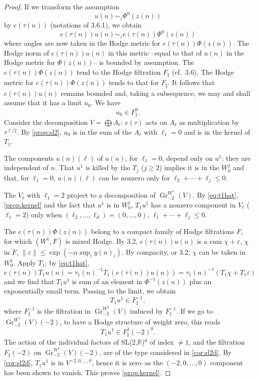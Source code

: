 \documentclass[11pt,a4paper]{article}
\theoremstyle{plain}
\theoremstyle{definition}
\DeclareMathOperator{\Gr}{Gr}
\begin{document}
\begin{proof}
If we transform the assumption
\[
u(n)\sim_z\Phi^0(z(n))
\]
by $e(\tau(n))$ (notations of 3.6.1), we obtain
\[
e(\tau(n))u(n)\sim_z e(\tau(n))\Phi^0(z(n))
\]
where angles are now taken in the Hodge metric for $e(\tau(n))\Phi(z(n))$. The Hodge norm of $e(\tau(n))u(n)$ in this metric --equal to that of $u(n)$ in the Hodge metric for $\Phi(z(n))$-- is bounded by assumption. The $e(\tau(n))\Phi(z(n))$ tend to the Hodge filtration $F_{\sharp}$ (cf.\ 3.6). The Hodge metric for $e(\tau(n))\Phi(z(n))$ tends to that for $F_{\sharp}$. It follows that $e(\tau(n))u(n)$ remains bounded and, taking a subsequence, we may and shall assume that it has a limit $u_0$. We have
\[
u_0\in F_{\sharp}^0.
\]
Consider the decomposition $V=\bigoplus A_{\ell}$: $e(\tau)$ acts on $A_{\ell}$ as multiplication by $\tau^{\ell/2}$. By \ref{prop:sl2}, $u_0$ is in the sum of the $A_{\ell}$ with $\ell_1=0$ and is in the kernel of $T_1$.

The components $u(n)(\ell)$ of $u(n)$, for $\ell_1=0$, depend only on $u^1$: they are independent of $n$. That $u^1$ is killed by the $T_j$ ($j\geq 2$) implies it is in the $W^j_0$ and that, for $\ell_1=0$, $u(n)(\ell)$ can be nonzero only for $\ell_2+\cdots+\ell_j\leq 0$.

The $V_{\ell}$ with $\ell_1=2$ project to a decomposition of $\Gr_{-2}^{W^1}(V)$. By \eqref{eq:t1hat}, \ref{prop:kernel} and the fact that $u^1$ is in $W^j_0$, $T_1 u^1$ has a nonzero component in $V_{\ell}$ ($\ell_1=2$) only when $(\ell_2,\dots,\ell_d)=(0,\dots,0)$, $\ell_1+\cdots+\ell_j\leq 0$.

The $e(\tau(n))\Phi(z(n))$ belong to a compact family of Hodge filtrations $F$, for which $(W^1,F)$ is mixed Hodge. By 3.2, $e(\tau(n))u(n)$ is a sum $\chi+\varepsilon$, $\chi$ in $F$, $\|\varepsilon\|\leq\exp(-\alpha\sup_i y(n)_i)$. By compacity, or 3.2, $\chi$ can be taken in $W^1_0$. Apply $T_1$; by \eqref{eq:t1hat},
\[
e(\tau(n))T_1 u(n)=\tau_1(n)^{-1}T_1(e(\tau(n))u(n))=\tau_1(n)^{-1}(T_1\chi+T_1\varepsilon)
\]
and we find that $T_1 u^1$ is sum of an element in $\Phi^{-1}(z(n))$ plus an exponentially small term. Passing to the limit, we obtain
\[
T_1 u^1\in F_{\sharp}^{-1},
\]
where $F_{\sharp}^{-1}$ is the filtration in $\Gr_{-2}^{W^1}(V)$ induced by $F_{\sharp}^{-1}$. If we go to $\Gr_{-2}^{W^1}(V)(-2)$, to have a Hodge structure of weight zero, this reads
\[
T_1 u^1\in F_{\sharp}^1(-2)^0.
\]
The action of the individual factors of SL(2,$\mathbb{R}$)$^d$ of index $\neq 1$, and the filtration $F_{\sharp}(-2)$ on $\Gr_{-2}^{W^1}(V)(-2)$, are of the type considered in \ref{cor:sl2d}. By \ref{cor:sl2d}, $T_1 u^1$ is in $V^{-2,0,\dots,0}$, hence it is zero--as the $(-2,0,\dots,0)$ component has been shown to vanish. This proves \ref{prop:kernel}.
\end{proof}
\end{document}
